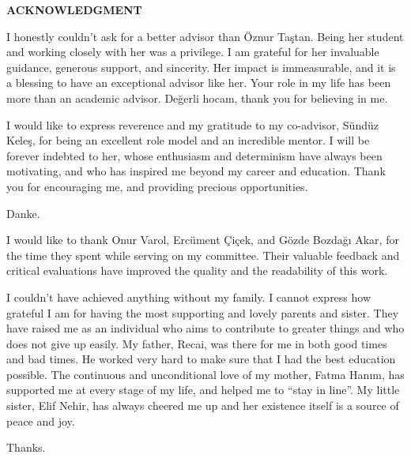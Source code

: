 \clearpage
\setlength{\parindent}{0pt}
\begin{center}
	\MakeUppercase{\textbf{acknowledgment}} \\ [3\baselineskip]
\end{center}

I honestly couldn't ask for a better advisor than Öznur Taştan.
Being her student and working closely with her was a privilege.
I am grateful for her invaluable guidance, generous support, and sincerity.
Her impact is immeasurable, and it is a blessing to have an exceptional advisor like her.
Your role in my life has been more than an academic advisor.
Değerli hocam, thank you for believing in me.

I would like to express reverence and my gratitude to my co-advisor, Sündüz Keleş, for being an excellent role model and an incredible mentor.
I will be forever indebted to her, whose enthusiasm and determinism have always been motivating, and who has inspired me beyond my career and education.
Thank you for encouraging me, and providing precious opportunities.

Danke.

I would like to thank Onur Varol, Ercüment Çiçek, and Gözde Bozdağı Akar, for the time they spent while serving on my committee.
Their valuable feedback and critical evaluations have improved the quality and the readability of this work.


I couldn't have achieved anything without my family.
I cannot express how grateful I am for having the most supporting and lovely parents and sister.
They have raised me as an individual who aims to contribute to greater things and who does not give up easily.
My father, Recai, was there for me in both good times and bad times.
He worked very hard to make sure that I had the best education possible.
The continuous and unconditional love of my mother, Fatma Hanım, has supported me at every stage of my life, and helped me to ``stay in line''.
My little sister, Elif Nehir, has always cheered me up and her existence itself is a source of peace and joy.

Thanks.
